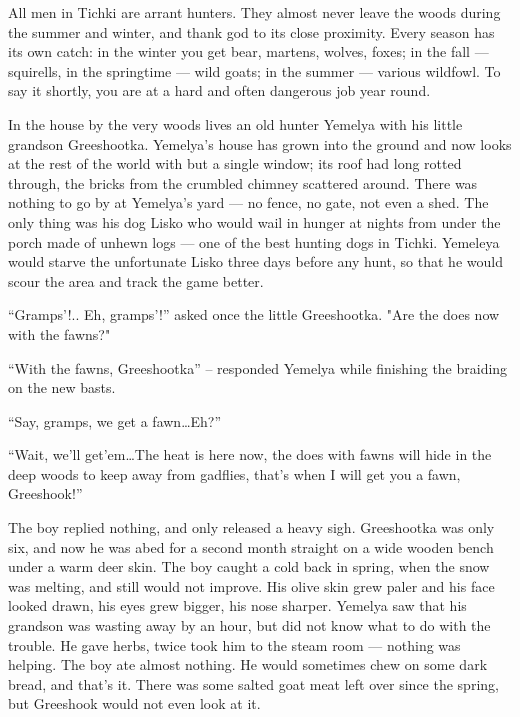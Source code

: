 \documentclass[b5paper,12pt,openany]{book}
\begin{document}
All men in Tichki are arrant hunters. They almost never leave the woods during the summer and winter,
and thank god to its close proximity. Every season has its own catch: in the winter you get bear, martens, wolves, foxes; in the fall --- squirells, in the springtime --- wild goats; in the summer --- various wildfowl. To say it shortly, you are at a hard and often dangerous job year round.

In the house by the very woods lives an old hunter Yemelya with his little grandson Greeshootka. Yemelya's house has grown into the ground and now looks at the rest of the world with but a single window; its roof had long rotted through, the bricks from the crumbled chimney scattered around. There was nothing to go by at Yemelya's yard --- no fence, no gate, not even a shed. The only thing was his dog Lisko who would wail in hunger at nights from under the porch made of unhewn logs --- one of the best hunting dogs in Tichki. Yemeleya would starve the unfortunate Lisko three days before any hunt, so that he would scour the area  and track the game better.

``Gramps'!.. Eh, gramps'!'' asked once the little Greeshootka. "Are the does now with the fawns?"

``With the fawns, Greeshootka'' -- responded Yemelya while finishing the braiding on the new basts.

``Say, gramps, we get a fawn\ldots Eh?''

``Wait, we'll get'em\ldots The heat is here now, the does with fawns will hide in the deep woods to keep away from gadflies, that's when I will get you a fawn, Greeshook!''

The boy replied nothing, and only released a heavy sigh. Greeshootka was only six, and now he was abed for a second month straight on a wide wooden bench under a warm deer skin. The boy caught a cold back in spring, when the snow was melting, and still would not improve. His olive skin grew paler and his face looked drawn, his eyes grew bigger, his nose sharper. Yemelya saw that his grandson was wasting away by an hour, but did not know what to do with the trouble. He gave herbs, twice took him to the steam room --- nothing was helping. The boy ate almost nothing. He would sometimes chew on some dark bread, and that's it. There was some salted goat meat left over since the spring, but Greeshook would not even look at it.
\end{document}
